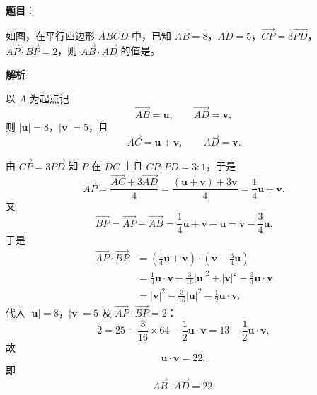 \begin{answer}

\textbf{题目}：

如图，在平行四边形 $ABCD$ 中，已知 $AB=8$，$AD=5$，$\overrightarrow{CP}=3\overrightarrow{PD}$，$\overrightarrow{AP}\cdot\overrightarrow{BP}=2$，则 $\overrightarrow{AB}\cdot\overrightarrow{AD}$ 的值是\gkblank{}。
\nopagebreak[4]
\begin{center}\end{center}
\nopagebreak[4]
\textbf{解析}

以 $A$ 为起点记
\nopagebreak[4]
\[\overrightarrow{AB}=\boldsymbol u,\qquad \overrightarrow{AD}=\boldsymbol v,\]
则 $|\boldsymbol u|=8$，$|\boldsymbol v|=5$，且
\nopagebreak[4]
\[\overrightarrow{AC}=\boldsymbol u+\boldsymbol v,\qquad \overrightarrow{AD}=\boldsymbol v.\]

由 $\overrightarrow{CP}=3\overrightarrow{PD}$ 知 $P$ 在 $DC$ 上且 $CP:PD=3:1$，于是
\nopagebreak[4]
\[\overrightarrow{AP}=\frac{\overrightarrow{AC}+3\overrightarrow{AD}}4=\frac{(\boldsymbol u+\boldsymbol v)+3\boldsymbol v}4=\frac14\boldsymbol u+\boldsymbol v.\]
又
\nopagebreak[4]
\[\overrightarrow{BP}=\overrightarrow{AP}-\overrightarrow{AB}=\frac14\boldsymbol u+\boldsymbol v-\boldsymbol u=\boldsymbol v-\frac34\boldsymbol u.\]
于是
\nopagebreak[4]
\[\begin{aligned}
\overrightarrow{AP}\cdot\overrightarrow{BP}
&=\left(\frac14\boldsymbol u+\boldsymbol v\right)\cdot\left(\boldsymbol v-\frac34\boldsymbol u\right)\\
&=\frac14\boldsymbol u\cdot\boldsymbol v-\frac3{16}|\boldsymbol u|^2+|\boldsymbol v|^2-\frac34\boldsymbol u\cdot\boldsymbol v\\
&=|\boldsymbol v|^2-\frac3{16}|\boldsymbol u|^2-\frac12\boldsymbol u\cdot\boldsymbol v.
\end{aligned}\]
代入 $|\boldsymbol u|=8$，$|\boldsymbol v|=5$ 及 $\overrightarrow{AP}\cdot\overrightarrow{BP}=2$：
\nopagebreak[4]
\[2=25-\frac3{16}\times64-\frac12\boldsymbol u\cdot\boldsymbol v=13-\frac12\boldsymbol u\cdot\boldsymbol v,\]
故
\nopagebreak[4]
\[\boldsymbol u\cdot\boldsymbol v=22,\]
即
\nopagebreak[4]
\[\overrightarrow{AB}\cdot\overrightarrow{AD}=22.\]


\end{answer}
